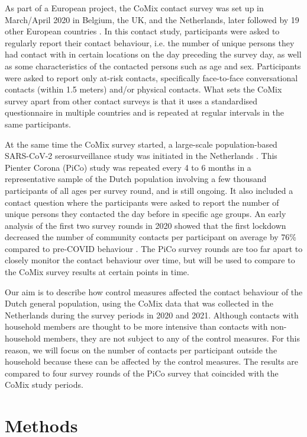 \documentclass[fleqn,10pt]{wlscirep}
\begin{document}
As part of a European project, the CoMix contact survey was set up in March/April 2020 in Belgium, the UK, and the Netherlands, later followed by 19 other European countries \cite{Verelst_2021}. In this contact study, participants were asked to regularly report their contact behaviour, i.e. the number of unique persons they had contact with in certain locations on the day preceding the survey day, as well as some characteristics of the contacted persons such as age and sex. Participants were asked to report only at-risk contacts, specifically face-to-face conversational contacts (within 1.5 meters) and/or physical contacts. What sets the CoMix survey apart from other contact surveys is that it uses a standardised questionnaire in multiple countries and is repeated at regular intervals in the same participants.

At the same time the CoMix survey started, a large-scale population-based SARS-CoV-2 serosurveillance study was initiated in the Netherlands \cite{Vos_2020, Vos_2021}. This Pienter Corona (PiCo) study was repeated every 4 to 6 months in a representative sample of the Dutch population involving a few thousand participants of all ages per survey round, and is still ongoing. It also included a contact question where the participants were asked to report the number of unique persons they contacted the day before in specific age groups. An early analysis of the first two survey rounds in 2020 showed that the first lockdown decreased the number of community contacts per participant on average by 76\% compared to pre-COVID behaviour \cite{Backer_2021}. The PiCo survey rounds are too far apart to closely monitor the contact behaviour over time, but will be used to compare to the CoMix survey results at certain points in time.

Our aim is to describe how control measures affected the contact behaviour of the Dutch general population, using the CoMix data that was collected in the Netherlands during the survey periods in 2020 and 2021. Although contacts with household members are thought to be more intensive than contacts with non-household members, they are not subject to any of the control measures. For this reason, we will focus on the number of contacts per participant outside the household because these can be affected by the control measures. The results are compared to four survey rounds of the PiCo survey that coincided with the CoMix study periods.


\section*{Methods}
\end{document}
